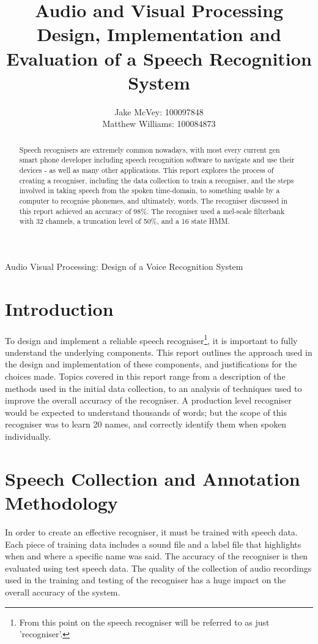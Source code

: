 \documentclass[journal]{IEEEtran}
\begin{document}
\title{
	Audio and Visual Processing \\ 
	\huge Design, Implementation and Evaluation of a Speech Recognition System
}

\author{
	Jake McVey: 100097848 \\
	Matthew Williams: 100084873
}

\maketitle

{Audio Visual Processing: Design of a Voice Recognition System}

\begin{abstract}
	Speech recognisers are extremely common nowadays, with most every current gen smart phone developer including speech recognition software to navigate and use their devices - as well as many other applications. This report explores the process of creating a recogniser, including the data collection to train a recogniser, and the steps involved in taking speech from the spoken time-domain, to something usable by a computer to recognise phonemes, and ultimately, words. The recogniser discussed in this report achieved an accuracy of 98\%. The recogniser used a mel-scale filterbank with 32 channels,  a truncation level of 50\%, and a 16 state HMM.
\end{abstract}

\section{Introduction}
To design and implement a reliable speech recogniser\footnote{From this point on the speech recogniser will be referred to as just 'recogniser'.}, it is important to fully understand the underlying components. This report outlines the approach used in the design and implementation of these components, and justifications for the choices made. Topics covered in this report range from a description of the methods used in the initial data collection, to an analysis of techniques used to improve the overall accuracy of the recogniser. A production level recogniser would be expected to understand thousands of words; but the scope of this recogniser was to learn 20 names, and correctly identify them when spoken individually. 

\section{Speech Collection and Annotation Methodology}
In order to create an effective recogniser, it must be trained with speech data. Each piece of training data includes a sound file and a label file that highlights when and where a specific name was said. The accuracy of the recogniser is then evaluated using test speech data. The quality of the collection of audio recordings used in the training and testing of the recogniser has a huge impact on the overall accuracy of the system. 
\end{document}
